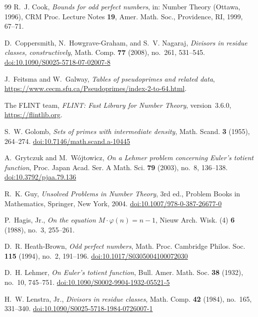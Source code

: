 \documentclass[screen,reqno]{aomart}
\numberwithin{equation}{section}
\theoremstyle{plain}
\theoremstyle{definition}
\theoremstyle{remark}
\begin{document}
\begin{thebibliography}{99}
R.~J. Cook,
\emph{Bounds for odd perfect numbers},
in: Number Theory (Ottawa, 1996), CRM Proc. Lecture Notes \textbf{19},
Amer. Math. Soc., Providence, RI, 1999, 67--71.

D.~Coppersmith, N.~Howgrave-Graham, and S.~V. Nagaraj,
\emph{Divisors in residue classes, constructively},
Math. Comp. \textbf{77} (2008), no.~261, 531--545.
\href{https://doi.org/10.1090/S0025-5718-07-02007-8}{doi:10.1090/S0025-5718-07-02007-8}

J.~Feitsma and W.~Galway,
\emph{Tables of pseudoprimes and related data},
\url{https://www.cecm.sfu.ca/Pseudoprimes/index-2-to-64.html}.

The FLINT team,
\emph{FLINT: Fast Library for Number Theory}, version~3.6.0,
\url{https://flintlib.org}.

S.~W. Golomb,
\emph{Sets of primes with intermediate density},
Math. Scand. \textbf{3} (1955), 264--274.
\href{https://doi.org/10.7146/math.scand.a-10445}{doi:10.7146/math.scand.a-10445}

A.~Grytczuk and M.~W\'ojtowicz,
\emph{On a Lehmer problem concerning Euler's totient function},
Proc. Japan Acad. Ser. A Math. Sci. \textbf{79} (2003), no.~8, 136--138.
\href{https://doi.org/10.3792/pjaa.79.136}{doi:10.3792/pjaa.79.136}

R.~K. Guy,
\emph{Unsolved Problems in Number Theory}, 3rd ed.,
Problem Books in Mathematics, Springer, New York, 2004.
\href{https://doi.org/10.1007/978-0-387-26677-0}{doi:10.1007/978-0-387-26677-0}

P.~Hagis, Jr.,
\emph{On the equation $M\cdot\varphi(n)=n-1$},
Nieuw Arch. Wisk. (4) \textbf{6} (1988), no.~3, 255--261.

D.~R. Heath-Brown,
\emph{Odd perfect numbers},
Math. Proc. Cambridge Philos. Soc. \textbf{115} (1994), no.~2, 191--196.
\href{https://doi.org/10.1017/S0305004100072030}{doi:10.1017/S0305004100072030}

D.~H. Lehmer,
\emph{On Euler's totient function},
Bull. Amer. Math. Soc. \textbf{38} (1932), no.~10, 745--751.
\href{https://doi.org/10.1090/S0002-9904-1932-05521-5}{doi:10.1090/S0002-9904-1932-05521-5}

H.~W. Lenstra, Jr.,
\emph{Divisors in residue classes},
Math. Comp. \textbf{42} (1984), no.~165, 331--340.
\href{https://doi.org/10.1090/S0025-5718-1984-0726007-1}{doi:10.1090/S0025-5718-1984-0726007-1}


\end{thebibliography}
\end{document}

